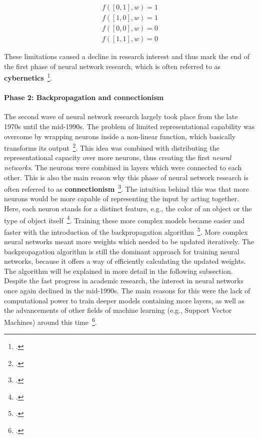 \begin{align}
  f ([0, 1], w) = 1\\
  f ([1, 0], w) = 1\\
  f ([0, 0], w) = 0\\
  f ([1, 1], w) = 0
\end{align}

These limitations caused a decline in research interest and thus mark the end
of the first phase of neural network research, which is often referred to
as \textbf{cybernetics}~\footcite{Goodfellow2016}.

\paragraph{Phase 2: Backpropagation and connectionism}

The second wave of neural network research largely took place from the late
1970s until the mid-1990s. 
The problem of limited representational capability was overcome by wrapping
neurons inside a non-linear function, which basically transforms its output~\footcite{Fukushima1975}.
This idea was combined with distributing the representational capacity over
more neurons, thus creating the first \textit{neural networks}. 
The neurons were combined in layers which were connected to each other.
This is also the main reason why this phase of neural network research is
often referred to as \textbf{connectionism}~\footcite{Goodfellow2016}.
The intuition behind this was that more neurons would be more capable of
representing the input by acting together. 
Here, each neuron stands for a distinct feature, e.g., the color of an object
or the type of object itself~\footcite{Rumelhart1986a}.
Training these more complex models became easier and faster with the
introduction of the backpropagation algorithm~\footcite{Rumelhart1986}.
More complex neural networks meant more weights which needed to be updated
iteratively. 
The backpropagation algorithm is still the dominant approach for training
neural networks, because it offers a way of efficiently calculating the
updated weights.
The algorithm will be explained in more detail in the following subsection.
Despite the fast progress in academic research, the interest in neural networks
once again declined in the mid-1990s. The main reasons for this were the
lack of computational power to train deeper models containing more layers, as 
well as the advancements of other fields of machine learning (e.g., Support
Vector Machines) around this time~\footcite{Goodfellow2016}.

